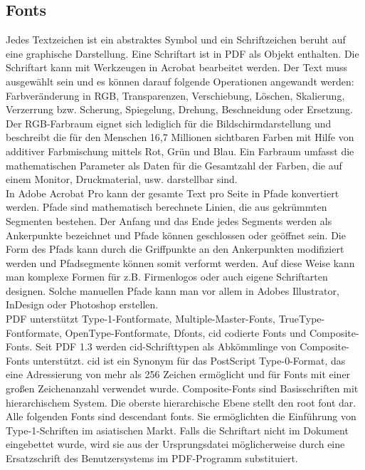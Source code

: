 \subsection{Fonts}
Jedes Textzeichen ist ein abstraktes Symbol und ein Schriftzeichen beruht auf eine graphische Darstellung. Eine Schriftart ist in PDF als Objekt enthalten. Die Schriftart kann mit Werkzeugen in Acrobat bearbeitet werden. Der Text muss ausgewählt sein und es können darauf folgende Operationen angewandt werden: Farbveränderung in RGB, Transparenzen, Verschiebung, Löschen, Skalierung, Verzerrung bzw. Scherung, Spiegelung, Drehung, Beschneidung oder Ersetzung. Der RGB-Farbraum eignet sich lediglich für die Bildschirmdarstellung und beschreibt die für den Menschen 16,7 Millionen sichtbaren Farben mit Hilfe von additiver Farbmischung mittels Rot, Grün und Blau. Ein Farbraum umfasst die mathematischen Parameter als Daten für die Gesamtzahl der Farben, die auf einem Monitor, Druckmaterial, usw. darstellbar sind. \cite{farbraum} \\
In Adobe Acrobat Pro kann der gesamte Text pro Seite in Pfade konvertiert werden. Pfade sind mathematisch berechnete Linien, die aus gekrümmten Segmenten bestehen. Der Anfang und das Ende jedes Segments werden als Ankerpunkte bezeichnet und Pfade können geschlossen oder geöffnet sein. Die Form des Pfads kann durch die Griffpunkte an den Ankerpunkten modifiziert werden und Pfadsegmente können somit verformt werden. \cite{adobe-pfade} Auf diese Weise kann man komplexe Formen für z.B. Firmenlogos oder auch eigene Schriftarten designen. Solche manuellen Pfade kann man vor allem in Adobes Illustrator, InDesign oder Photoshop erstellen. \\ 
PDF unterstützt Type-1-Fontformate, Multiple-Master-Fonts, TrueType-Fontformate, OpenType-Fontformate, Dfonts, \gls{cid} codierte Fonts und Composite-Fonts. Seit PDF 1.3 werden \gls{cid}-Schrifttypen als Abkömmlinge von Composite-Fonts unterstützt. \gls{cid} ist ein Synonym für das PostScript Type-0-Format, das eine Adressierung von mehr als 256 Zeichen ermöglicht und für Fonts mit einer großen Zeichenanzahl verwendet wurde. \cite{typoinfo} Composite-Fonts sind Basisschriften mit hierarchischem System. Die oberste hierarchische Ebene stellt den root font dar. Alle folgenden Fonts sind descendant fonts. Sie ermöglichten die Einführung von Type-1-Schriften im asiatischen Markt. \cite{schneeberger} Falls die Schriftart nicht im Dokument eingebettet wurde, wird sie aus der Ursprungsdatei möglicherweise durch eine Ersatzschrift des Benutzersystems im PDF-Programm substituiert. \cite{schneeberger}

